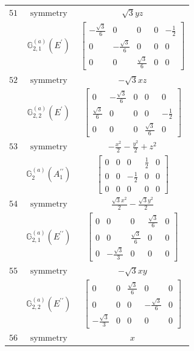 \documentclass[fleqn,8pt,landscape]{jsarticle}
\begin{document}
\begin{longtable}{ccc}
$ 51 $ & $ \text{symmetry} $ & $ \sqrt{3} y z $ \\
$  $ & $ \mathbb{G}_{2,1}^{(a)}(E^{\prime}) $ & $ \begin{bmatrix} - \frac{\sqrt{3}}{6} & 0 & 0 & 0 & - \frac{1}{2} \\ 0 & - \frac{\sqrt{3}}{6} & 0 & 0 & 0 \\ 0 & 0 & \frac{\sqrt{3}}{6} & 0 & 0 \end{bmatrix} $ \\ \hline
$ 52 $ & $ \text{symmetry} $ & $ - \sqrt{3} x z $ \\
$  $ & $ \mathbb{G}_{2,2}^{(a)}(E^{\prime}) $ & $ \begin{bmatrix} 0 & - \frac{\sqrt{3}}{6} & 0 & 0 & 0 \\ \frac{\sqrt{3}}{6} & 0 & 0 & 0 & - \frac{1}{2} \\ 0 & 0 & 0 & \frac{\sqrt{3}}{6} & 0 \end{bmatrix} $ \\ \hline
$ 53 $ & $ \text{symmetry} $ & $ - \frac{x^{2}}{2} - \frac{y^{2}}{2} + z^{2} $ \\
$  $ & $ \mathbb{G}_{2}^{(a)}(A_{1}^{\prime\prime}) $ & $ \begin{bmatrix} 0 & 0 & 0 & \frac{1}{2} & 0 \\ 0 & 0 & - \frac{1}{2} & 0 & 0 \\ 0 & 0 & 0 & 0 & 0 \end{bmatrix} $ \\ \hline
$ 54 $ & $ \text{symmetry} $ & $ \frac{\sqrt{3} x^{2}}{2} - \frac{\sqrt{3} y^{2}}{2} $ \\
$  $ & $ \mathbb{G}_{2,1}^{(a)}(E^{\prime\prime}) $ & $ \begin{bmatrix} 0 & 0 & 0 & \frac{\sqrt{3}}{6} & 0 \\ 0 & 0 & \frac{\sqrt{3}}{6} & 0 & 0 \\ 0 & - \frac{\sqrt{3}}{3} & 0 & 0 & 0 \end{bmatrix} $ \\ \hline
$ 55 $ & $ \text{symmetry} $ & $ - \sqrt{3} x y $ \\
$  $ & $ \mathbb{G}_{2,2}^{(a)}(E^{\prime\prime}) $ & $ \begin{bmatrix} 0 & 0 & \frac{\sqrt{3}}{6} & 0 & 0 \\ 0 & 0 & 0 & - \frac{\sqrt{3}}{6} & 0 \\ - \frac{\sqrt{3}}{3} & 0 & 0 & 0 & 0 \end{bmatrix} $ \\ \hline
$ 56 $ & $ \text{symmetry} $ & $ x $ \\

\end{longtable}
\end{document}
